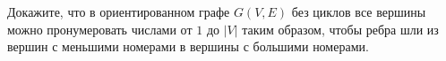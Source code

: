 Докажите, что в ориентированном графе $G(V, E)$ без циклов все вершины можно пронумеровать числами от $1$ до $|V|$ таким
образом, чтобы ребра шли из вершин с меньшими номерами в вершины с большими номерами.